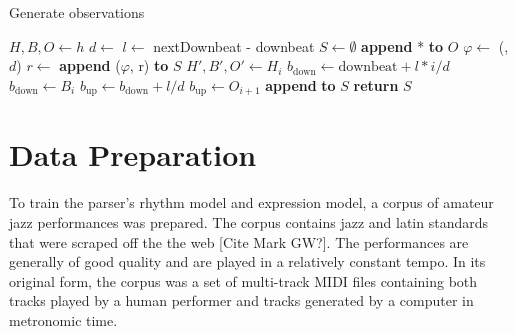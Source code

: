 \begin{algorithm}
\caption{Generate observations}
\label{alg:observations}
\begin{algorithmic}
	\State $H, B, O \leftarrow h$
	\State $d \leftarrow$ 
	\State $l \leftarrow$ nextDownbeat - downbeat
	\State $S \leftarrow \emptyset$
	\State \textbf{append} * \textbf{to} $O$
			\State $\varphi \leftarrow$ (, $d$)
			\State $r \leftarrow$ 
			\State \textbf{append} ($\varphi$, r) \textbf{to} $S$
		\EndIf	
		\State $H', B', O' \leftarrow H_i$
			\State $b_{\mathrm{down}} \leftarrow \mathrm{downbeat} + l * i/d$
				\State $b_{\mathrm{down}} \leftarrow B_i$
			\EndIf
			\State $b_{\mathrm{up}} \leftarrow b_{\mathrm{down}} + l/d$
				\State $b_{\mathrm{up}} \leftarrow O_{i+1}$
			\EndIf
			\State \textbf{append}  \textbf{to} $S$
		\EndIf
	\EndFor
	\State \textbf{return} $S$
\EndFunction
\end{algorithmic}
\end{algorithm}








\section{Data Preparation}
\label{sec:corpus}

To train the parser's rhythm model and expression model, a corpus of amateur jazz performances was prepared. The corpus contains jazz and latin standards that were scraped off the the web [Cite Mark GW?]. The performances are generally of good quality and are played in a relatively constant tempo. In its original form, the corpus was a set of multi-track MIDI files containing both tracks played by a human performer and tracks generated by a computer in metronomic time.

